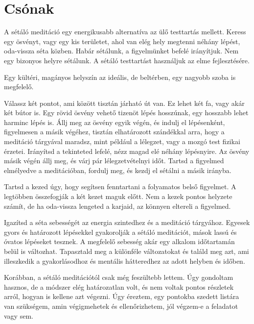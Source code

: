 \chapter{Csónak}


\noindent A sétáló meditáció egy energikusabb alternatíva az ülő
testtartás mellett. Keress egy ösvényt, vagy egy kis területet, ahol van
elég hely megtenni néhány lépést, oda-vissza séta közben. Habár
sétálunk, a figyelmünket befelé irányítjuk. Nem egy bizonyos helyre
sétálunk. A sétáló testtartást használjuk az elme fejlesztésére.

Egy kültéri, magányos helyszín az ideális, de beltérben, egy nagyobb
szoba is megfelelő.

Válassz két pontot, ami között tisztán járható út van. Ez lehet két fa,
vagy akár két bútor is. Egy rövid ösvény vehető tizenöt lépés hosszúnak,
egy hosszabb lehet harminc lépés is. Állj meg az ösvény egyik végén, és
indulj el lépésenként, figyelmesen a másik végéhez, tisztán elhatározott
szándékkal arra, hogy a meditáció tárgyával maradsz, mint például a
lélegzet, vagy a mozgó test fizikai érzetei. Irányítsd a tekinteted
lefelé, nézz magad elé néhány lépésnyire. Az ösvény másik végén állj
meg, és várj pár lélegzetvételnyi időt. Tartsd a figyelmed elmélyedve a
meditációban, fordulj meg, és kezdj el sétálni a másik irányba.

Tartsd a kezed úgy, hogy segítsen fenntartani a folyamatos belső
figyelmet. A legtöbben összefogják a két kezet maguk előtt. Nem a kezek
pontos helyzete számít, de ha oda-vissza lengeted a karjaid, az könnyen
eltereli a figyelmed.

\clearpage
\null\thispagestyle{empty}%
%
%
\label{illus-walking-meditation}%
\clearpage

Igazítsd a séta sebességét az energia szintedhez és a meditáció
tárgyához. Egyesek gyors és határozott lépésekkel gyakorolják a sétáló
meditációt, mások lassú és óvatos lépéseket tesznek. A megfelelő
sebesség akár egy alkalom időtartamán belül is változhat. Tapasztald meg
a különféle változatokat és találd meg azt, ami illeszkedik a
gyakorlásodhoz és mentális hátteredhez az adott helyben és időben.


Korábban, a sétáló meditációtól csak még feszültebb lettem. Úgy
gondoltam hasznos, de a módszer elég határozatlan volt, és nem voltak
pontos részletek arról, hogyan is kellene azt végezni. Úgy éreztem, egy
pontokba szedett listára van szükségem, amin végigmehetek és
ellenőrizhetem, jól végzem-e a feladatot vagy sem.


